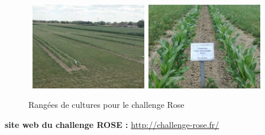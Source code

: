 \begin {figure}[!h]
\begin{center}

    \hbox{ 
    \includegraphics[width=5cm]{images/imageRang1.jpg}
    \hspace*{1cm}  %
    \includegraphics[width=5cm]{images/imageRang2.jpg}
  }
\caption{Rangées de cultures pour le challenge Rose}
\label{Rangées de cultures pour le challenge Rose}
\end{center}
\end {figure}

\textbf{site web du challenge ROSE : }\url{http://challenge-rose.fr/}


